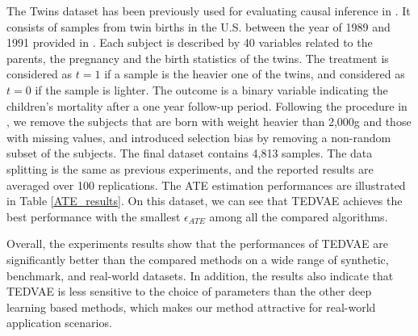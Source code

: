 \documentclass[letterpaper]{article} %
\begin{document}

The Twins dataset has been previously used for evaluating causal inference in \cite{Louizos2017,Yao2018_Twin}. It consists of samples from twin births in the U.S. between the year of 1989 and 1991 provided in \cite{Almond2005_TwinData}. Each subject is described by 40 variables related to the parents, the pregnancy and the birth statistics of the twins.
The treatment is considered as $t=1$ if a sample is the heavier one of the twins, and considered as $t=0$ if the sample is lighter. 
The outcome is a binary variable indicating the children's mortality after a one year follow-up period. 
Following the procedure in \cite{Yao2018_Twin}, we remove the subjects that are born with weight heavier than 2,000g and those with missing values, and introduced selection bias by removing a non-random subset of the subjects. The final dataset contains 4,813 samples. The data splitting is the same as previous experiments, and the reported results are averaged over 100 replications. 
The ATE estimation performances are illustrated in Table \ref{ATE_results}. 
On this dataset, we can see that TEDVAE achieves the best performance with the smallest $\epsilon_{ATE}$ among all the compared algorithms. 

Overall, the experiments results show that the performances of TEDVAE are significantly better than the compared methods on a wide range of synthetic, benchmark, and real-world datasets. In addition, the results also indicate that TEDVAE is less sensitive to the choice of parameters than the other deep learning based methods, which makes our method attractive for real-world application scenarios. 
\end{document}
